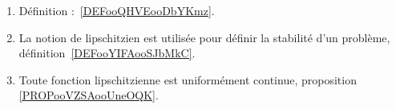 
	\label{THEMEooFonctionsLipschitz}
\begin{enumerate}
	\item
	      Définition :~\ref{DEFooQHVEooDbYKmz}.
	\item
	      La notion de lipschitzien est utilisée pour définir la stabilité d'un problème, définition~\ref{DEFooYIFAooSJbMkC}.
      \item 
          Toute fonction lipschitzienne est uniformément continue, proposition \ref{PROPooVZSAooUneOQK}.
\end{enumerate}

